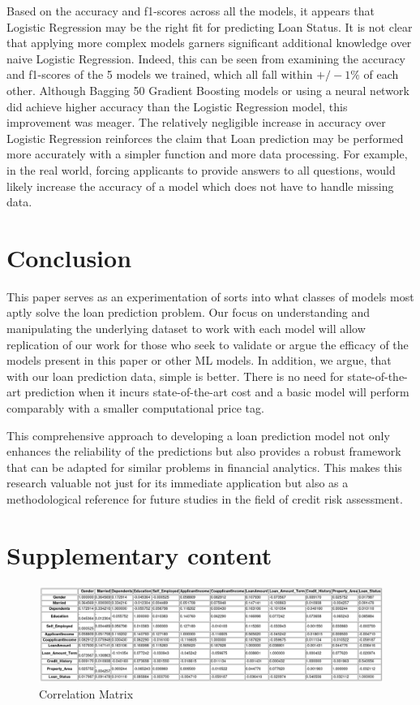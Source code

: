 \documentclass[conference]{IEEEtran}
\begin{document}
Based on the accuracy and f1-scores across all the models, it appears that Logistic Regression may be the right fit for predicting Loan Status. It is not clear that applying more complex models garners significant additional knowledge over naive Logistic Regression. Indeed, this can be seen from examining the accuracy and f1-scores of the 5 models we trained, which all fall within $+/-1\%$ of each other. Although Bagging 50 Gradient Boosting models or using a neural network did achieve higher accuracy than the Logistic Regression model, this improvement was meager. The relatively negligible increase in accuracy over Logistic Regression reinforces the claim that Loan prediction may be performed more accurately with a simpler function and more data processing. For example, in the real world, forcing applicants to provide answers to all questions, would likely increase the accuracy of a model which does not have to handle missing data.

\section{Conclusion}
This paper serves as an experimentation of sorts into what classes of models most aptly solve the loan prediction problem. Our focus on understanding and manipulating the underlying dataset to work with each model will allow replication of our work for those who seek to validate or argue the efficacy of the models present in this paper or other ML models. In addition, we argue, that with our loan prediction data, simple is better. There is no need for state-of-the-art prediction when it incurs state-of-the-art cost and a basic model will perform comparably with a smaller computational price tag.

This comprehensive approach to developing a loan prediction model not only enhances the reliability of the predictions but also provides a robust framework that can be adapted for similar problems in financial analytics. This makes this research valuable not just for its immediate application but also as a methodological reference for future studies in the field of credit risk assessment.


\appendices
\section{Supplementary content}
\newline
\begin{figure}[H]
        \centering
        \includegraphics[width=1\linewidth]{Data5.jpg}
        \caption{Correlation Matrix}
        \label{fig:enter-label}
    \end{figure}
\end{document}
